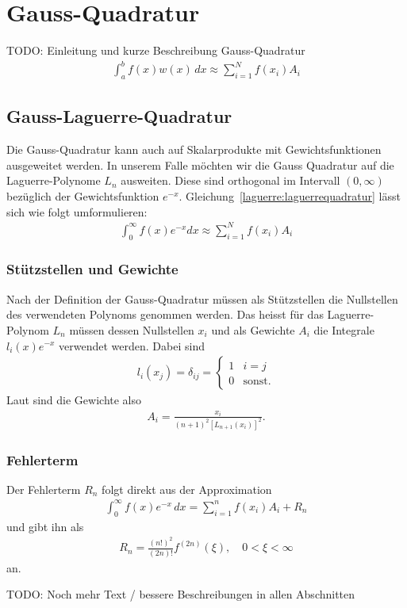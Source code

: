%
%
%
\section{Gauss-Quadratur
  \label{laguerre:section:quadratur}}
 {\large \color{red} TODO: Einleitung und kurze Beschreibung Gauss-Quadratur}
\begin{align}
\int_a^b f(x) w(x) \, dx
\approx
\sum_{i=1}^N f(x_i) A_i
\label{laguerre:gaussquadratur}
\end{align}

\subsection{Gauss-Laguerre-Quadratur
\label{laguerre:subsection:gausslag-quadratur}}
Die Gauss-Quadratur kann auch auf Skalarprodukte mit Gewichtsfunktionen
ausgeweitet werden.
In unserem Falle möchten wir die Gauss Quadratur auf die Laguerre-Polynome
$L_n$ ausweiten.
Diese sind orthogonal im Intervall $(0, \infty)$ bezüglich
der Gewichtsfunktion $e^{-x}$.
Gleichung~\eqref{laguerre:laguerrequadratur} lässt sich wie folgt umformulieren:
\begin{align}
\int_{0}^{\infty} f(x) e^{-x} dx
\approx
\sum_{i=1}^{N} f(x_i) A_i
\label{laguerre:laguerrequadratur}
\end{align}

\subsubsection{Stützstellen und Gewichte}
Nach der Definition der Gauss-Quadratur müssen als Stützstellen die Nullstellen
des verwendeten Polynoms genommen werden.
Das heisst für das Laguerre-Polynom $L_n$ müssen dessen Nullstellen $x_i$ und
als Gewichte $A_i$ die Integrale $l_i(x)e^{-x}$ verwendet werden.
Dabei sind
\begin{align*}
l_i(x_j)
=
\delta_{ij}
=
\begin{cases}
1 & i=j           \\
0 & \text{sonst.}
\end{cases}
\end{align*}
Laut \cite{abramowitz+stegun} sind die Gewichte also
\begin{align}
A_i
=
\frac{x_i}{(n + 1)^2 \left[ L_{n + 1}(x_i)\right]^2}
.
\label{laguerre:quadratur_gewichte}
\end{align}

\subsubsection{Fehlerterm}
Der Fehlerterm $R_n$ folgt direkt aus der Approximation
\begin{align*}
\int_0^{\infty} f(x) e^{-x} \, dx
=
\sum_{i=1}^n f(x_i) A_i + R_n
\end{align*}
und \cite{abramowitz+stegun} gibt ihn als
\begin{align}
R_n
=
\frac{(n!)^2}{(2n)!} f^{(2n)}(\xi)
,\quad
0 < \xi < \infty
\label{laguerre:lag_error}
\end{align}
an.

{
\large \color{red}
TODO:
Noch mehr Text / bessere Beschreibungen in allen Abschnitten
}
